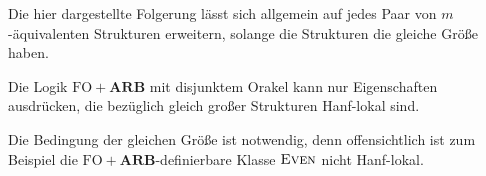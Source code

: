 Die hier dargestellte Folgerung lässt sich allgemein auf jedes Paar
von $m$-äquivalenten Strukturen erweitern, solange die Strukturen
die gleiche Größe haben.
\begin{cor}
Die Logik $\mathrm{FO}+\mathbf{ARB}$ mit disjunktem Orakel kann nur
Eigenschaften ausdrücken, die bezüglich gleich großer Strukturen Hanf-lokal
sind.
\end{cor}
Die Bedingung der gleichen Größe ist notwendig, denn offensichtlich
ist zum Beispiel die $\mathrm{FO}+\mathbf{ARB}$-definierbare Klasse
$\textsc{Even}$ nicht Hanf-lokal.
